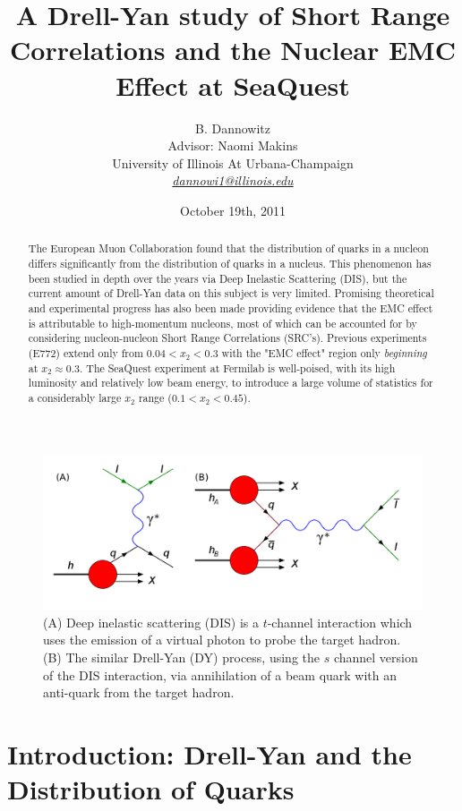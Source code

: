 \documentclass[11pt]{article}
\title{{\Large \textbf A Drell-Yan study of Short Range Correlations and the Nuclear EMC Effect at SeaQuest}}%
\author{B. Dannowitz\\%
  Advisor: Naomi Makins\\%
  University of Illinois At Urbana-Champaign\\%
  \href{mailto:dannowi1@illinois.edu}{\emph{dannowi1@illinois.edu}}}
\date{\normalsize{October 19th, 2011}}
\begin{document}
  \maketitle
  \begin{abstract}
The European Muon Collaboration found that the distribution of quarks in a nucleon differs significantly from the distribution of quarks in a nucleus. This phenomenon has been studied in depth over the years via Deep Inelastic Scattering (DIS), but the current amount of Drell-Yan data on this subject is very limited. Promising theoretical and experimental progress has also been made providing evidence that the EMC effect is attributable to high-momentum nucleons, most of which can be accounted for by considering nucleon-nucleon Short Range Correlations (SRC's).  Previous experiments (E772) extend only from $0.04<x_2<0.3$ with the "EMC effect" region only \emph{beginning} at $x_2\approx0.3$. The SeaQuest experiment at Fermilab is well-poised, with its high luminosity and relatively low beam energy, to introduce a large volume of statistics for a considerably large $x_2$ range ($0.1<x_2<0.45$).
  \end{abstract}

\thispagestyle{empty} 

\newpage

\tableofcontents

\newpage

\begin{figure}
    \centerline{
    \mbox{\includegraphics[width=4.50in]{DIS-DY.png}}
    }
    \caption{(A) Deep inelastic scattering (DIS) is a $t$-channel interaction which uses the emission of a virtual photon to probe the target hadron. (B) The similar Drell-Yan (DY) process, using the $s$ channel version of the DIS interaction, via annihilation of a beam quark with an anti-quark from the target hadron.}
    \label{fig:dis-dy}
\end{figure}

\section{Introduction: Drell-Yan and the Distribution of Quarks}
\end{document}
